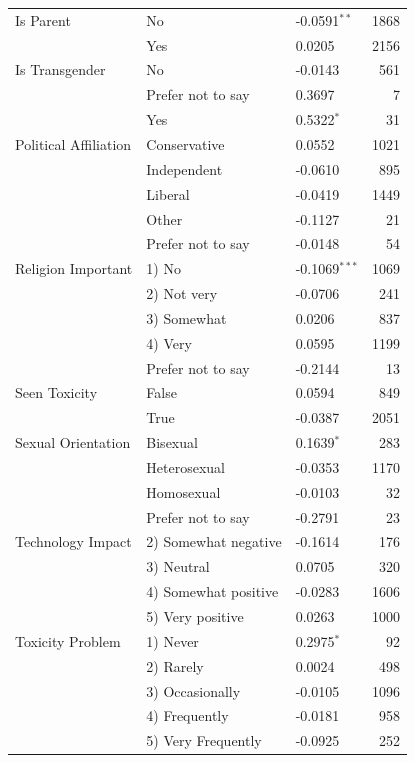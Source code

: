 \begin{longtable}[ht]{lllr}
Is Parent & No & -0.0591$^{**}$ & 1868 \\
 & Yes & 0.0205 & 2156 \\
Is Transgender & No & -0.0143 & 561 \\
 & Prefer not to say & 0.3697 & 7 \\
 & Yes & 0.5322$^{*}$ & 31 \\
Political Affiliation & Conservative & 0.0552 & 1021 \\
 & Independent & -0.0610 & 895 \\
 & Liberal & -0.0419 & 1449 \\
 & Other & -0.1127 & 21 \\
 & Prefer not to say & -0.0148 & 54 \\
Religion Important & 1) No & -0.1069$^{***}$ & 1069 \\
 & 2) Not very & -0.0706 & 241 \\
 & 3) Somewhat & 0.0206 & 837 \\
 & 4) Very & 0.0595 & 1199 \\
 & Prefer not to say & -0.2144 & 13 \\
Seen Toxicity & False & 0.0594 & 849 \\
 & True & -0.0387 & 2051 \\
Sexual Orientation & Bisexual & 0.1639$^{*}$ & 283 \\
 & Heterosexual & -0.0353 & 1170 \\
 & Homosexual & -0.0103 & 32 \\
 & Prefer not to say & -0.2791 & 23 \\
Technology Impact & 2) Somewhat negative & -0.1614 & 176 \\
 & 3) Neutral & 0.0705 & 320 \\
 & 4) Somewhat positive & -0.0283 & 1606 \\
 & 5) Very positive & 0.0263 & 1000 \\
Toxicity Problem & 1) Never & 0.2975$^{*}$ & 92 \\
 & 2) Rarely & 0.0024 & 498 \\
 & 3) Occasionally & -0.0105 & 1096 \\
 & 4) Frequently & -0.0181 & 958 \\
 & 5) Very Frequently & -0.0925 & 252 \\
\end{longtable}
